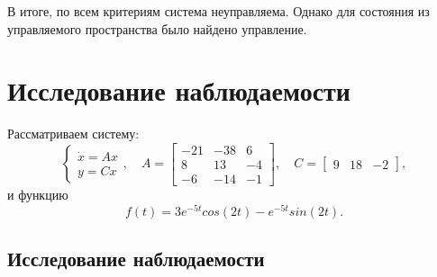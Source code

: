 В итоге, по всем критериям система неуправляема. Однако для состояния из управляемого пространства было найдено управление.



\section{Исследование наблюдаемости}

Рассматриваем систему:
\begin{equation*}
    \begin{cases}
        \dot x = Ax\\
        y = Cx
    \end{cases},\quad
    A = \begin{bmatrix}
        -21 & -38 & 6 \\
        8 & 13 & -4 \\
        -6 & -14 & -1
    \end{bmatrix},\quad
    C = \begin{bmatrix}
        9 & 18 & -2
    \end{bmatrix},
\end{equation*}
и функцию
\begin{equation*}
    f(t)=3e^{-5t} cos(2t) - e^{-5t} sin(2t).
\end{equation*}

\subsection{Исследование наблюдаемости}

